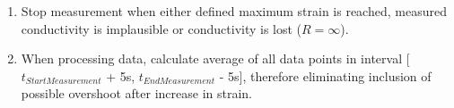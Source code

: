 \begin{appendices}
\begin{enumerate}
	\item Stop measurement when either defined maximum strain is reached, measured conductivity is implausible or conductivity is lost ($R=\infty$).
	
	\item When processing data, calculate average of all data points in interval [$t_{StartMeasurement}$ + 5s, $t_{EndMeasurement}$ - 5s], therefore eliminating inclusion of possible overshoot after increase in strain.
\end{enumerate}


\end{appendices}

